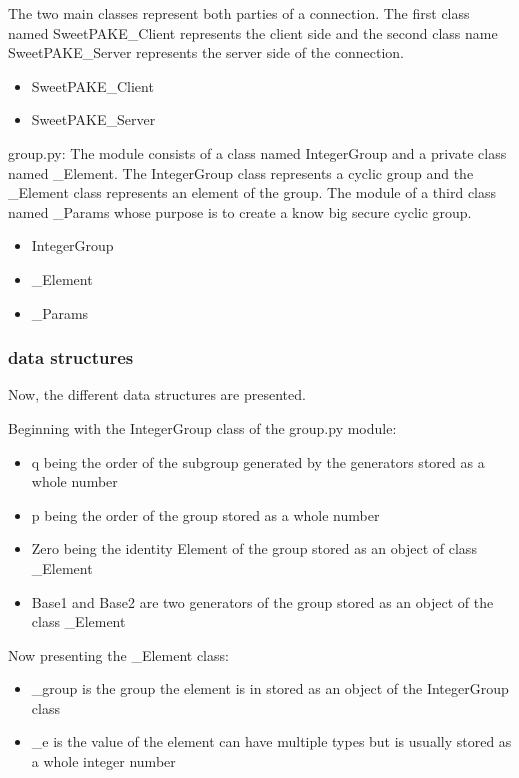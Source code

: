\documentclass[../main.tex]{subfiles}
\begin{document}
The two main classes represent both parties of a connection. The first class
named SweetPAKE\_Client represents the client side and the second class name
SweetPAKE\_Server represents the server side of the connection.

\begin{itemize}
	\item SweetPAKE\_Client
	\item SweetPAKE\_Server
\end{itemize}

group.py: The module consists of a class named IntegerGroup and a private class
named \_Element. The IntegerGroup class represents a cyclic group and the
\_Element class represents an element of the group. The module of a third class
named \_Params whose purpose is to create a know big secure cyclic group.

\begin{itemize}
	\item IntegerGroup
	\item \_Element
	\item \_Params
\end{itemize}

\subsubsection{data structures}
Now, the different data structures are presented.

Beginning with the IntegerGroup class of the group.py module:
\begin{itemize}
	\item q being the order of the subgroup generated by the generators stored as a whole number
	\item p being the order of the group stored as a whole number
	\item Zero being the identity Element of the group stored as an object of class \_Element 
	\item Base1 and Base2 are two generators of the group
		stored as an object of the class \_Element
\end{itemize}

Now presenting the \_Element class:
\begin{itemize}
	\item \_group is the group the element is in stored as an object of the
		IntegerGroup class 
        \item \_e is the value of the element can have
		multiple types but is usually stored as a whole integer number
\end{itemize}
\end{document}
